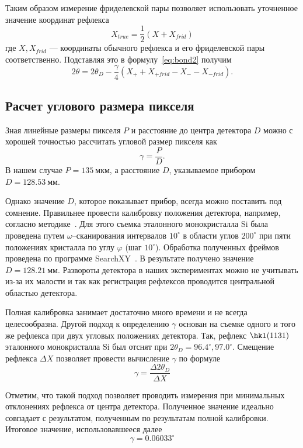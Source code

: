 \documentclass[a4paper,14pt]{extarticle}
\newcommand{\unit}[1]{ \ \text{#1}}
\newcommand{\degree}{^\circ}
\begin{document}
Таким образом измерение фриделевской пары позволяет использовать уточненное значение координат рефлекса
\[X_{true} = \frac{1}{2}(X + X_{frid})\]
где $X, X_{frid}$ --- координаты обычного рефлекса и его фриделевской пары соответственно.
Подставляя это в формулу~\ref{eq:bond2} получим
\begin{equation} \label{eq:bond4}
    2\theta = 2\theta_D - \frac{\gamma}{4} (X_{+} + X_{+frid} - X_{-} - X_{-frid}).
\end{equation}
\subsection{Расчет углового размера пикселя}
Зная линейные размеры пикселя $P$ и расстояние до центра детектора $D$ можно с хорошей точностью рассчитать угловой размер пикселя как
\begin{equation} \label{eq:gamma_simple}
    \gamma = \frac{P}{D}.
\end{equation}
В нашем случае $P = 135\unit{мкм}$, а расстояние $D$, указываемое прибором $D = 128.53\unit{мм}$.

Однако значение $D$, которое показывает прибор, всегда можно поставить под сомнение.
Правильнее провести калибровку положения детектора, например, согласно методике~\cite{Panchenko:2023}.
Для этого съемка эталонного монокристалла Si была проведена путем $\omega$--сканирования интервалов $10\degree$ в области углов $200\degree$ при пяти положениях кристалла по углу $\varphi$ (шаг $10\degree$).
Обработка полученных фреймов проведена по программе SearchXY~\cite{Panchenko:2023}.
В результате получено значение $D = 128.21\unit{мм}$.
Развороты детектора в наших экспериментах можно не учитывать из-за их малости и так как регистрация рефлексов проводится центральной областью детектора.

Полная калибровка занимает достаточно много времени и не всегда целесообразна.
Другой подход к определению $\gamma$ основан на съемке одного и того же рефлекса при двух угловых положениях детектора.
Так, рефлекс $\hkl(11 3 1)$ эталонного монокристалла Si был отснят при $2\theta_D = 96.4\degree, 97.0\degree$.
Смещение рефлекса $\Delta X$ позволяет провести вычисление $\gamma$ по формуле
\begin{equation} \label{eq:gamma_delta}
    \gamma = \frac{\Delta 2\theta_D}{\Delta X}
\end{equation}

Отметим, что такой подход позволяет проводить измерения при минимальных отклонениях рефлекса от центра детектора.
Полученное значение идеально совпадает с результатом, полученным по результатам полной калибровки.
Итоговое значение, использовавшееся далее
\[ \gamma = 0.06033\degree \]
\end{document}

